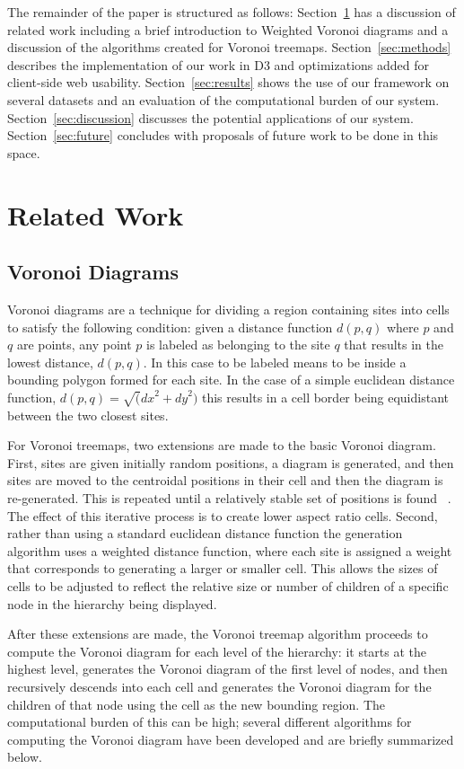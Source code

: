 \documentclass{acm_proc_article-sp} \usepackage{cite}
\begin{document}
The remainder of the paper is structured as follows: Section~\ref{sec:related} has a
discussion of related work including a brief introduction to Weighted
Voronoi diagrams and a discussion of the algorithms created for
Voronoi treemaps. Section~\ref{sec:methods} describes the implementation of our work
in D3 and optimizations added for client-side web usability. Section~\ref{sec:results}
shows the use of our framework on several datasets and an evaluation
of the computational burden of our system. Section~\ref{sec:discussion} discusses the
potential applications of our system. Section~\ref{sec:future} concludes with
proposals of future work to be done in this space.

\section{Related Work}
\label{sec:related}

\subsection{Voronoi Diagrams}
Voronoi diagrams are a technique for dividing a region containing
sites into cells to satisfy the following condition: given a distance
function $d(p, q)$ where $p$ and $q$ are points, any point $p$ is
labeled as belonging to the site $q$ that results in the lowest
distance, $d(p,q)$. In this case to be labeled means to be inside a
bounding polygon formed for each site. In the case of a simple
euclidean distance function, $d(p,q) = \sqrt({dx}^2 + {dy}^2)$ this
results in a cell border being equidistant between the two closest
sites.

For Voronoi treemaps, two extensions are made to the basic Voronoi
diagram. First, sites are given initially random positions, a diagram
is generated, and then sites are moved to the centroidal positions in
their cell and then the diagram is re-generated. This is repeated
until a relatively stable set of positions is found ~\cite{lloyd}. The
effect of this iterative process is to create lower aspect ratio
cells. Second, rather than using a standard euclidean distance
function the generation algorithm uses a weighted distance function,
where each site is assigned a weight that corresponds to generating a
larger or smaller cell. This allows the sizes of cells to be adjusted
to reflect the relative size or number of children of a specific node
in the hierarchy being displayed.

After these extensions are made, the Voronoi treemap algorithm
proceeds to compute the Voronoi diagram for each level of the
hierarchy: it starts at the highest level, generates the Voronoi
diagram of the first level of nodes, and then recursively descends
into each cell and generates the Voronoi diagram for the children of
that node using the cell as the new bounding region. The computational
burden of this can be high; several different algorithms for computing
the Voronoi diagram have been developed and are briefly summarized
below.
\end{document}
